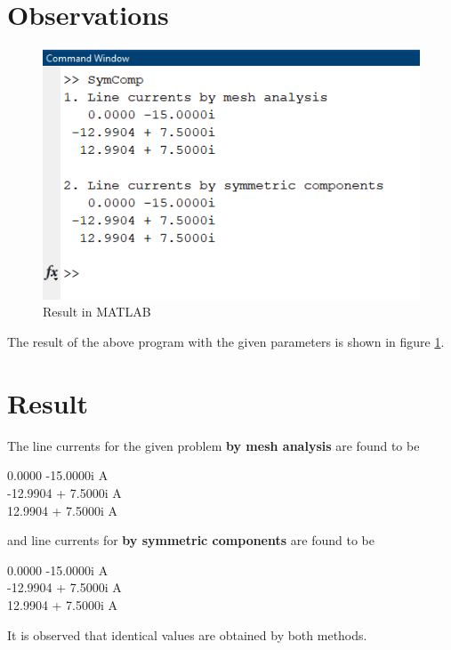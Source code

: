 \documentclass[a4paper,12pt]{article}
\begin{document}
  \section{Observations}
  \begin{figure}[H]
    \centering
    \includegraphics{img/run.png}
    \caption{Result in MATLAB}
    \label{result}
  \end{figure}
  The result of the above program with the given parameters 
  is shown in figure \ref{result}.

  \section{Result}
  The line currents for the given problem {\bf by mesh analysis} are found to be
  \begin{center}
    0.0000 -15.0000i A\\
    -12.9904 + 7.5000i A\\
    12.9904 + 7.5000i A
  \end{center}
  and line currents for {\bf by symmetric components} are found to be
  \begin{center}
    0.0000 -15.0000i A\\
    -12.9904 + 7.5000i A\\
    12.9904 + 7.5000i A
  \end{center}
  It is observed that identical values are obtained by both methods.
\end{document}
